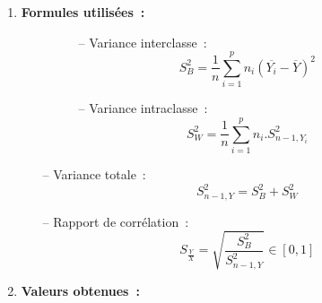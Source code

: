 \begin{enumerate}
    \item \textbf{Formules utilisées~:}
        \begin{figure}[!h]
            \centering
            \begin{minipage}{.49\linewidth}
                \begin{itemize}
                    \item[--] Variance interclasse~: 
                        \begin{equation}
                            S^2_{B} = \frac{1}{n} \sum_{i=1}^{p} n_{i}(\overline{Y_{i}} - \overline{Y})^2
                        \end{equation}
                \end{itemize}
            \end{minipage}\hfill\vline
            \begin{minipage}{.49\linewidth}
                \begin{itemize}
                    \item[--] Variance intraclasse~:
                        \begin{equation}
                            S^2_{W} = \frac{1}{n} \sum_{i=1}^{p} n_{i}.S^2_{n-1,Y_{i}}
                        \end{equation}
                \end{itemize}
            \end{minipage}
        \end{figure}

        \begin{itemize}
            \item[--] Variance totale~:
                \begin{equation}\label{eq:var_total}
                    S^2_{n-1,Y} = S^2_{B} + S^2_{W}
                \end{equation}
            \item[--] Rapport de corrélation~:
                \begin{equation}
                    S_{\frac{Y}{X}} = \sqrt{\frac{S^2_{B}}{S^2_{n-1,Y}}} \in [0 , 1]
                \end{equation}
        \end{itemize}

    \item \textbf{Valeurs obtenues~:}
    
        \vspace{.2cm}


\end{enumerate}
